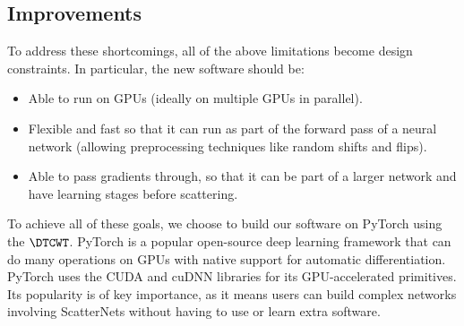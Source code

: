 \subsection{Improvements}
To address these shortcomings, all of the above limitations become design
constraints. In particular, the new software should be:
\begin{itemize}
  \item Able to run on GPUs (ideally on multiple GPUs in parallel).
  \item Flexible and fast so that it can run as part of the forward pass of
    a neural network (allowing preprocessing techniques like random shifts and
    flips).
  \item Able to pass gradients through, so that it can be part of a larger
    network and have learning stages before scattering.
\end{itemize}

To achieve all of these goals, we choose to build our software on PyTorch using
the $\DTCWT$. PyTorch is a popular open-source deep learning framework that can
do many operations on GPUs with native support for automatic differentiation.
PyTorch uses the CUDA and cuDNN libraries for its GPU-accelerated primitives.
Its popularity is of key importance, as it means users can build complex
networks involving ScatterNets without having to use or learn extra software.
